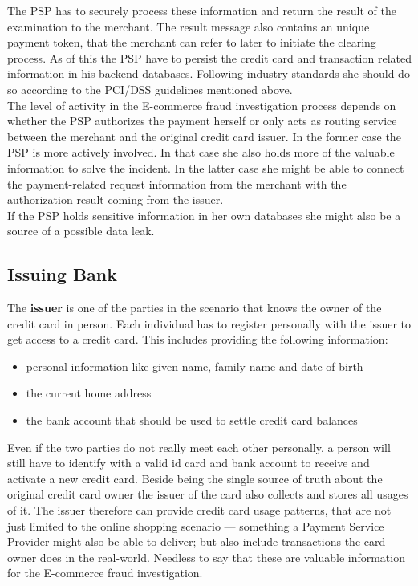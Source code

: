 The \gls{PSP} has to securely process these information and return the result of the examination to the merchant. The result message also contains an unique payment token, that the merchant can refer to later to initiate the clearing process. As of this the \gls{PSP} have to persist the credit card and transaction related information in his backend databases. Following industry standards she should do so according to the PCI/DSS guidelines mentioned above.\\

The level of activity in the E-commerce fraud investigation process depends on whether the \gls{PSP} authorizes the payment herself or only acts as routing service between the merchant and the original credit card issuer. In the former case the \gls{PSP} is more actively involved. In that case she also holds more of the valuable information to solve the incident. In the latter case she might be able to connect the payment-related request information from the merchant with the authorization result coming from the issuer.\\

If the \gls{PSP} holds sensitive information in her own databases she might also be a source of a possible data leak.


\subsection{Issuing Bank}
\label{subsec:stakeholder_issuer}

The \textbf{issuer} is one of the parties in the scenario that knows the owner of the credit card in person. Each individual has to register personally with the issuer to get access to a credit card. This includes providing the following information:\@

\begin{itemize}
		\item personal information like given name, family name and date of birth
		\item the current home address
		\item the bank account that should be used to settle credit card balances
\end{itemize}

Even if the two parties do not really meet each other personally, a person will still have to identify with a valid id card and bank account to receive and activate a new credit card. Beside being the single source of truth about the original credit card owner the issuer of the card also collects and stores all  usages of it. The issuer therefore can provide credit card usage patterns, that are not just limited to the online shopping scenario --- something a Payment Service Provider might also be able to deliver; but also include transactions the card owner does in the real-world. Needless to say that these are valuable information for the E-commerce fraud investigation. \\

